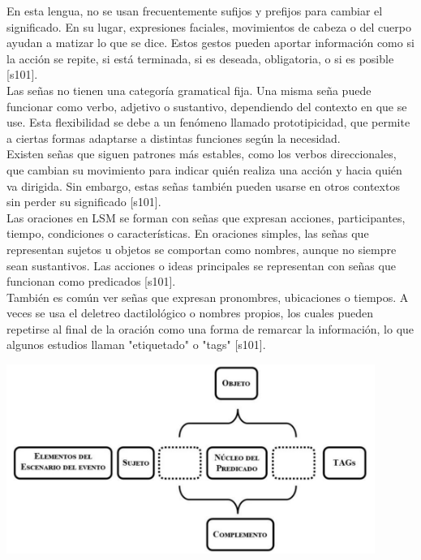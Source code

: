 En esta lengua, no se usan frecuentemente sufijos y prefijos para cambiar el significado. En su lugar, expresiones faciales, movimientos de cabeza o del cuerpo ayudan a matizar lo que se dice. Estos gestos pueden aportar información como si la acción se repite, si está terminada, si es deseada, obligatoria, o si es posible [s101].\\

Las señas no tienen una categoría gramatical fija. Una misma seña puede funcionar como verbo, adjetivo o sustantivo, dependiendo del contexto en que se use. Esta flexibilidad se debe a un fenómeno llamado prototipicidad, que permite a ciertas formas adaptarse a distintas funciones según la necesidad.\\

Existen señas que siguen patrones más estables, como los verbos direccionales, que cambian su movimiento para indicar quién realiza una acción y hacia quién va dirigida. Sin embargo, estas señas también pueden usarse en otros contextos sin perder su significado [s101].\\

Las oraciones en LSM se forman con señas que expresan acciones, participantes, tiempo, condiciones o características. En oraciones simples, las señas que representan sujetos u objetos se comportan como nombres, aunque no siempre sean sustantivos. Las acciones o ideas principales se representan con señas que funcionan como predicados [s101].\\

También es común ver señas que expresan pronombres, ubicaciones o tiempos. A veces se usa el deletreo dactilológico o nombres propios, los cuales pueden repetirse al final de la oración como una forma de remarcar la información, lo que algunos estudios llaman "etiquetado" o "tags" [s101].\\

\begin{center}
    \includegraphics[width=0.9\textwidth]{Images/Cap 2/Estructura_gramatica_LSM.png}
\end{center}

